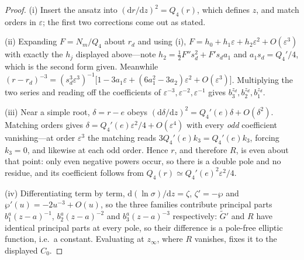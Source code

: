 \documentclass[12pt]{iopart}
\newcommand{\dd}{\mathrm{d}}
\theoremstyle{plain}
\theoremstyle{definition}
\theoremstyle{plain}
\theoremstyle{remark}
\begin{document}
\begin{proof}
(i) Insert the ansatz into $(\dd r/\dd z)^2=Q_4(r)$, which defines $z$, and match orders in
$\varepsilon$; the first two corrections come out as stated.

(ii) Expanding $F=N_m/Q_4$ about $r_d$ and using (i),
$F=h_0+h_1\varepsilon+h_2\varepsilon^2+O(\varepsilon^3)$ with exactly the $h_j$ displayed
above---note $h_2=\tfrac12F''s_d^2+F's_da_1$ and $a_1s_d=Q_4'/4$, which is the second form
given. Meanwhile
$(r-r_d)^{-3}=(s_d^3\varepsilon^3)^{-1}\big[1-3a_1\varepsilon+(6a_1^2-3a_2)\varepsilon^2
+O(\varepsilon^3)\big]$. Multiplying the two series and reading off the coefficients of
$\varepsilon^{-3},\varepsilon^{-2},\varepsilon^{-1}$ gives $b_3^{z_d},b_2^{z_d},b_1^{z_d}$.

(iii) Near a simple root, $\delta=r-e$ obeys $(\dd\delta/\dd z)^2=Q_4'(e)\delta+O(\delta^2)$.
Matching orders gives $\delta=Q_4'(e)\varepsilon^2/4+O(\varepsilon^4)$ with every
\emph{odd} coefficient vanishing---at order $\varepsilon^3$ the matching reads
$3Q_4'(e)k_3=Q_4'(e)k_3$, forcing $k_3=0$, and likewise at each odd order. Hence $r$, and
therefore $R$, is even about that point: only even negative powers occur, so there is a
double pole and no residue, and its coefficient follows from
$Q_4(r)\simeq Q_4'(e)^2\varepsilon^2/4$.

(iv) Differentiating term by term, $\dd(\ln\sigma)/\dd z=\zeta$, $\zeta'=-\wp$ and
$\wp'(u)=-2u^{-3}+O(u)$, so the three families contribute principal parts
$b_1^a(z-a)^{-1}$, $b_2^a(z-a)^{-2}$ and $b_3^a(z-a)^{-3}$ respectively: $\tilde G'$ and
$R$ have identical principal parts at every pole, so their difference is a pole-free
elliptic function, i.e.\ a constant. Evaluating at $z_\infty$, where $R$ vanishes, fixes it
to the displayed $C_0$.
\end{proof}
\end{document}
